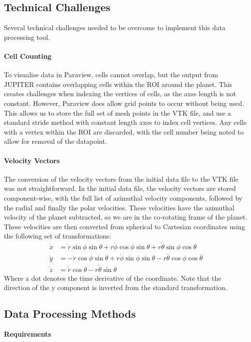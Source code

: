 \documentclass[twocolumn]{aastex62}
\begin{document}
\subsection{Technical Challenges}
Several technical challenges needed to be overcome to implement this data processing tool.
\paragraph{Cell Counting}
To visualise data in Paraview, cells cannot overlap, but the output from JUPITER contains overlapping cells within the ROI around the planet. 
This creates challenges when indexing the vertices of cells, as the axss length is not constant.
However, Paraview does allow grid points to occur without being used. 
This allows us to store the full set of mesh points in the VTK file, and use a standard stride method with constant length axes to index cell vertices.
Any cells with a vertex within the ROI are discarded, with the cell number being noted to allow for removal of the datapoint.

\paragraph{Velocity Vectors}
The conversion of the velocity vectors from the initial data file to the VTK file was not straightforward. 
In the initial data file, the velocity vectors are stored component-wise, with the full list of azimuthal velocity components, followed by the radial and finally the polar velocities.
These velocities have the azimuthal velocity of the planet subtracted, so we are in the co-rotating frame of the planet.
These velocities are then converted from spherical to Cartesian coordinates using the following set of transformations:
\begin{align}
\dot{x} &= \dot{r}\sin{\phi}\sin{\theta} + r\dot{\phi}\cos{\phi}\sin{\theta} + r\dot{\theta}\sin{\phi}\cos{\theta}  \\
\dot{y} &= -\dot{r}\cos{\phi}\sin{\theta} + r\dot{\phi}\sin{\phi}\sin{\theta} - r\dot{\theta}\cos{\phi}\cos{\theta}  \\
\dot{z} & = \dot{r}\cos{\theta} - r\dot{\theta}\sin{\theta}
\end{align}
Where a dot denotes the time derivative of the coordinate.
Note that the direction of the y component is inverted from the standard transformation.
\subsection{Data Processing Methods}\label{sec:code}
\textbf{Requirements}
\end{document}
